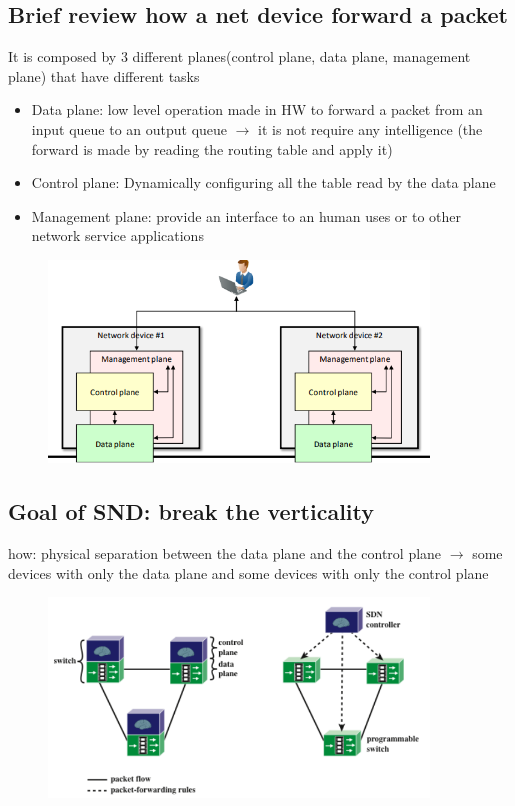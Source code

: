 \documentclass{article}
\begin{document}
\subsection{Brief review how a net device forward a packet}
It is composed by 3 different planes(control plane, data plane, management plane) that have different tasks
  \begin{itemize}
    \item Data plane: low level operation made in HW to forward a packet from an input queue to an output queue $\rightarrow$ it is not require any intelligence (the forward is made by reading the routing table and apply it)
    \item Control plane: Dynamically configuring all the table read by the data plane
    \item Management plane: provide an interface to an human uses or to other network service applications
  \end{itemize}
\begin{figure}[h]
    \centering
    \includegraphics[width=0.90\textwidth]{figure/control_data_plane.png}
\end{figure}


\subsection{Goal of SND: break the verticality}
how: physical separation between the data plane and the control plane $\rightarrow$ some devices with only the data plane and some devices with only the control plane 

\begin{figure}[h]
    \centering
    \includegraphics[width=0.90\textwidth]{figure/SDN_config.png}
\end{figure}
\end{document}
